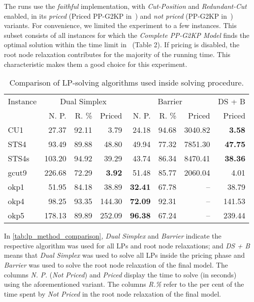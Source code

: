 \documentclass[smallextended]{svjour3}       %
\begin{document}
The runs use the \emph{faithful} implementation, with \emph{Cut-Position} and \emph{Redundant-Cut} enabled, in its \emph{priced} (Priced PP-G2KP in~\cite{furini:2016,dimitri_thesis}) and \emph{not priced} (PP-G2KP in~\cite{furini:2016,dimitri_thesis}) variants.
For convenience, we limited the experiment to a few instances.
This subset consists of all instances for which the \emph{Complete PP-G2KP Model} finds the optimal solution within the time limit in~\cite{furini:2016} (Table 2).
If pricing is disabled, the root node relaxation contributes for the majority of the running time.
This characteristic makes them a good choice for this experiment.

\begin{table}
\caption{Comparison of LP-solving algorithms used inside solving procedure.}
\begin{tabular}{@{\extracolsep{4pt}}lrrrrrrr@{}}
\hline\hline
Instance & \multicolumn{3}{c}{Dual Simplex} & \multicolumn{3}{c}{Barrier} & DS + B \\\cline{2-4}\cline{5-7}
& N. P. & R. \% & Priced & N. P. & R. \% & Priced & Priced \\\hline
CU1 & 27.37 & 92.11 & 3.79 & 24.18 & 94.68 & 3040.82 & \textbf{3.58} \\
STS4 & 93.49 & 89.88 & 48.80 & 49.94 & 77.32 & 7851.30 & \textbf{47.75} \\
STS4s & 103.20 & 94.92 & 39.29 & 43.74 & 86.34 & 8470.41 & \textbf{38.36} \\
gcut9 & 226.68 & 72.29 & \textbf{3.92} & 51.48 & 85.77 & 2060.04 & 4.01 \\
okp1 & 51.95 & 84.18 & 38.89 & \textbf{32.41} & 67.78 & -- & 38.79 \\
okp4 & 98.25 & 93.35 & 144.30 & \textbf{72.09} & 92.31 & -- & 141.53 \\
okp5 & 178.13 & 89.89 & 252.09 & \textbf{96.38} & 67.24 & -- & 239.44 \\\hline\hline
\end{tabular}
\label{tab:lp_method_comparison}
\end{table}

In \autoref{tab:lp_method_comparison}, \emph{Dual Simplex} and \emph{Barrier} indicate the respective algorithm was used for all LPs and root node relaxations;
and \emph{DS + B} means that \emph{Dual Simplex} was used to solve all LPs inside the pricing phase and \emph{Barrier} was used to solve the root node relaxation of the final model.
The columns \emph{N. P.} (\emph{Not Priced}) and \emph{Priced} display the time to solve (in seconds) using the aforementioned variant.
The columns \emph{R.\%} refer to the per cent of the time spent by \emph{Not Priced} in the root node relaxation of the final model.
\end{document}
